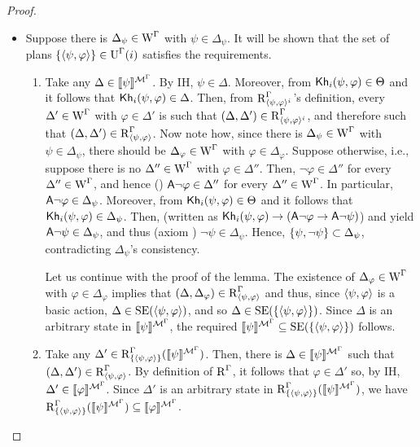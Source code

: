 \begin{proof}
\begin{itemize}
\item Suppose there is $\Delta_\psi \in \operatorname{W}^\Gamma$ with $\psi \in \Delta_\psi$. It will be shown that the set of plans $\{ \langle \psi, \varphi \rangle \} \in \operatorname{U}^\Gamma(i)$ satisfies the requirements.
\begin{enumerate}
\item Take any $\Delta \in \llbracket \psi \rrbracket^{\mathcal{M}^\Gamma}$. By IH, $\psi \in \Delta$.
Moreover, from ${\sf Kh}_i(\psi, \varphi) \in \Theta$ and  it follows that ${\sf Kh}_i(\psi, \varphi) \in \Delta$.
Then, from $\operatorname{R}^\Gamma_{\langle \psi,\varphi \rangle^i}$'s definition, every $\Delta' \in \operatorname{W}^\Gamma$ with $\varphi \in \Delta'$ is such that $(\Delta, \Delta') \in \operatorname{R}^\Gamma_{\langle \psi,\varphi \rangle^i}$, and therefore such that $(\Delta, \Delta') \in \operatorname{R}^\Gamma_{\langle \psi,\varphi \rangle}$.
Now note how, since there is $\Delta_\psi \in \operatorname{W}^\Gamma$ with $\psi \in \Delta_\psi$, there should be $\Delta_\varphi \in \operatorname{W}^\Gamma$ with $\varphi \in \Delta_\varphi$.
Suppose otherwise, i.e., suppose there is no $\Delta'' \in \operatorname{W}^\Gamma$ with $\varphi \in \Delta''$. Then, $\lnot \varphi \in \Delta''$ for every $\Delta'' \in \operatorname{W}^\Gamma$, and hence () ${\sf A}\lnot\varphi \in \Delta''$ for every $\Delta'' \in \operatorname{W}^\Gamma$.
In particular, ${\sf A}\lnot\varphi \in \Delta_\psi$. Moreover, from ${\sf Kh}_i(\psi, \varphi) \in \Theta$ and  it follows that ${\sf Kh}_i(\psi, \varphi) \in \Delta_\psi$. Then,  (written as ${\sf Kh}_i(\psi, \varphi) \rightarrow ({\sf A}\lnot \varphi \rightarrow {\sf A} \lnot \psi)$) and  yield ${\sf A}\lnot\psi \in \Delta_\psi$, and thus (axiom ) $\lnot\psi \in \Delta_\psi$.
Hence, $\{ \psi, \lnot\psi \} \subset \Delta_\psi$, contradicting $\Delta_\psi$'s consistency.

Let us continue with the proof of the lemma. The existence of $\Delta_\varphi \in \operatorname{W}^\Gamma$ with $\varphi \in \Delta_\varphi$ implies that $(\Delta, \Delta_\varphi) \in \operatorname{R}^\Gamma_{\langle \psi,\varphi \rangle}$ and thus, since $\langle \psi,\varphi \rangle$ is a basic action, $\Delta \in \operatorname{SE}(\langle \psi,\varphi \rangle)$, and so $\Delta \in \operatorname{SE}(\{ \langle \psi,\varphi \rangle \})$. Since $\Delta$ is an arbitrary state in $\llbracket \psi \rrbracket^{\mathcal{M}^\Gamma}$, the required $\llbracket \psi \rrbracket^{\mathcal{M}^\Gamma} \subseteq \operatorname{SE}(\{ \langle \psi,\varphi \rangle \})$ follows.

\item Take any $\Delta' \in \operatorname{R}^\Gamma_{\{ \langle \psi,\varphi \rangle \}}(\llbracket \psi \rrbracket^{\mathcal{M}^\Gamma})$. Then, there is $\Delta \in \llbracket \psi \rrbracket^{\mathcal{M}^\Gamma}$ such that $(\Delta, \Delta') \in \operatorname{R}^\Gamma_{\langle \psi,\varphi \rangle}$. By definition of $\operatorname{R}^\Gamma$, it follows that $\varphi \in \Delta'$ so, by IH, $\Delta' \in \llbracket \varphi \rrbracket^{\mathcal{M}^\Gamma}$. Since $\Delta'$ is an arbitrary state in $\operatorname{R}^\Gamma_{\{ \langle \psi,\varphi \rangle \}}(\llbracket \psi \rrbracket^{\mathcal{M}^\Gamma})$, we have $\operatorname{R}^\Gamma_{\{ \langle \psi,\varphi \rangle \}}(\llbracket \psi \rrbracket^{\mathcal{M}^\Gamma}) \subseteq \llbracket \varphi \rrbracket^{\mathcal{M}^\Gamma}$.
\end{enumerate}
\end{itemize}
\end{proof}

